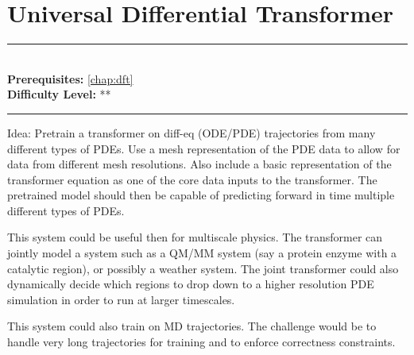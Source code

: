 \documentclass[book.tex]{subfiles}
\begin{document}
\chapter{Universal Differential Transformer}

\label{chap:deep_onet}
\noindent\rule{11cm}{0.4pt} \\
\textbf{Prerequisites:} \autoref{chap:dft} \\
\textbf{Difficulty Level:} ** \\
\noindent\rule{11cm}{0.4pt}
\vspace{5mm}

Idea: Pretrain a transformer on diff-eq (ODE/PDE) trajectories from many different types of PDEs. Use a mesh representation of the PDE data to allow for data from different mesh resolutions. Also include a basic representation of the transformer equation as one of the core data inputs to the transformer. The pretrained model should then be capable of predicting forward in time multiple different types of PDEs. 

This system could be useful then for multiscale physics. The transformer can jointly model a system such as a QM/MM system (say a protein enzyme with a catalytic region), or possibly a weather system. The joint transformer could also dynamically decide which regions to drop down to a higher resolution PDE simulation in order to run at larger timescales.

This system could also train on MD trajectories. The challenge would be to handle very long trajectories for training and to enforce correctness constraints.
\end{document}

